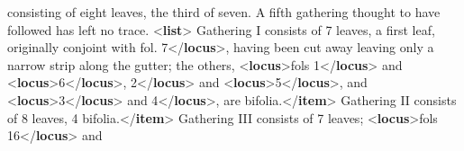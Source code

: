 \begin{shaded}
\hspace*{1em}\hspace*{1em} consisting of eight leaves, the third of seven. A fifth gathering thought to\mbox{}\newline 
\hspace*{1em}\hspace*{1em} have followed has left no trace. {<\textbf{list}>}\mbox{}\newline 
\hspace*{1em}\hspace*{1em}Gathering I consists of 7 leaves, a first leaf, originally conjoint with\mbox{}\newline 
\hspace*{1em}\hspace*{1em}fol. 7{</\textbf{locus}>}, having been cut away leaving only a narrow strip along\mbox{}\newline 
\hspace*{1em}\hspace*{1em}\hspace*{1em}\hspace*{1em}\hspace*{1em}\hspace*{1em} the gutter; the others, {<\textbf{locus}>}fols 1{</\textbf{locus}>} and {<\textbf{locus}>}6{</\textbf{locus}>},\mbox{}\newline 
\hspace*{1em}\hspace*{1em}2{</\textbf{locus}>} and {<\textbf{locus}>}5{</\textbf{locus}>}, and {<\textbf{locus}>}3{</\textbf{locus}>} and\mbox{}\newline 
\hspace*{1em}\hspace*{1em}4{</\textbf{locus}>}, are bifolia.{</\textbf{item}>}\mbox{}\newline 
\hspace*{1em}\hspace*{1em}Gathering II consists of 8 leaves, 4 bifolia.{</\textbf{item}>}\mbox{}\newline 
\hspace*{1em}\hspace*{1em}Gathering III consists of 7 leaves; {<\textbf{locus}>}fols 16{</\textbf{locus}>} and\mbox{}\newline 

\end{shaded}
